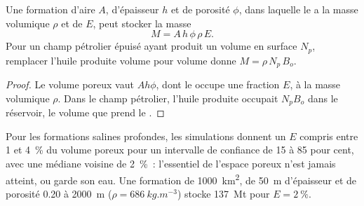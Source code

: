 \begin{omfigure}
\begin{minipage}[b]{0.49\linewidth}
\end{minipage}
\par{}
\end{omfigure}

\begin{proposition}\label{prop:b2:energy-geology:capacity}
Une formation d'aire $A$, d'épaisseur $h$ et de porosité $\phi$, dans laquelle le  a la masse volumique $\rho$
et de  $E$, peut stocker la masse
\begin{equation}
M = A\,h\,\phi\,\rho\,E .
\label{eq:b2:energy-geology:capacity}
\end{equation}
Pour un champ pétrolier épuisé ayant produit un volume en surface $N_p$, remplacer l'huile produite
volume pour volume donne $M = \rho\,N_p\,B_o$.
\end{proposition}

\begin{proof}
Le volume poreux vaut $Ah\phi$, dont le  occupe une fraction $E$, à la masse volumique $\rho$. Dans le
champ pétrolier, l'huile produite occupait $N_pB_o$ dans le réservoir, le volume que prend le .
\end{proof}

Pour les formations salines profondes, les simulations donnent un $E$ compris entre 1 et \qty{4}{\percent} du volume poreux
pour un intervalle de confiance de 15 à 85 pour cent, avec une médiane voisine de \qty{2}{\percent}~: l'essentiel de l'espace poreux
n'est jamais atteint, ou garde son eau. Une formation de \qty{1000}{km^2}, de \qty{50}{m} d'épaisseur et de porosité 0.20 à \qty{2000}{m}
($\rho = \qty{686}{kg.m^{-3}}$) stocke \qty{137}{Mt} pour $E =
\qty{2}{\percent}$.

